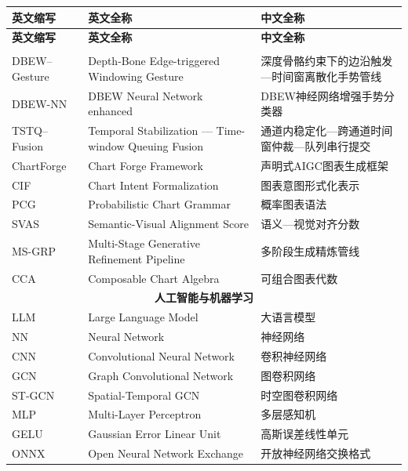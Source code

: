 \begin{center}
    \begin{longtable}{m{2.5cm}m{6.5cm}m{5.5cm}}
        \toprule
        \textbf{英文缩写}&\textbf{英文全称}&\textbf{中文全称}\\
        \midrule
        \endfirsthead
        \toprule
        \textbf{英文缩写}&\textbf{英文全称}&\textbf{中文全称}\\
        \midrule
        \endhead
        \bottomrule
        \endfoot
        \bottomrule
        \endlastfoot
        \multicolumn{3}{c}{\textbf{本文提出的方法与系统}} \\
        \midrule
        DBEW--Gesture & Depth-Bone Edge-triggered Windowing Gesture & 深度骨骼约束下的边沿触发—时间窗离散化手势管线 \\
        DBEW-NN & DBEW Neural Network enhanced & DBEW神经网络增强手势分类器 \\
        TSTQ--Fusion & Temporal Stabilization — Time-window Queuing Fusion & 通道内稳定化—跨通道时间窗仲裁—队列串行提交 \\
        ChartForge & Chart Forge Framework & 声明式AIGC图表生成框架 \\
        CIF & Chart Intent Formalization & 图表意图形式化表示 \\
        PCG & Probabilistic Chart Grammar & 概率图表语法 \\
        SVAS & Semantic-Visual Alignment Score & 语义—视觉对齐分数 \\
        MS-GRP & Multi-Stage Generative Refinement Pipeline & 多阶段生成精炼管线 \\
        CCA & Composable Chart Algebra & 可组合图表代数 \\
        \midrule
        \multicolumn{3}{c}{\textbf{人工智能与机器学习}} \\
        \midrule
        LLM & Large Language Model & 大语言模型 \\
        NN & Neural Network & 神经网络 \\
        CNN & Convolutional Neural Network & 卷积神经网络 \\
        GCN & Graph Convolutional Network & 图卷积网络 \\
        ST-GCN & Spatial-Temporal GCN & 时空图卷积网络 \\
        MLP & Multi-Layer Perceptron & 多层感知机 \\
        GELU & Gaussian Error Linear Unit & 高斯误差线性单元 \\
        ONNX & Open Neural Network Exchange & 开放神经网络交换格式 \\

\end{longtable}
\end{center}
